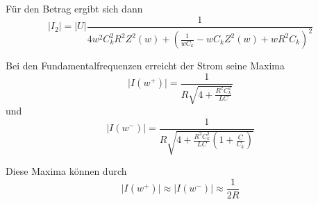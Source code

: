 Für den Betrag ergibt sich dann
\begin{equation}
    \lvert I_2\rvert = \lvert U\rvert \frac{1}{ 4w^2C_k^2R^2Z^2(w) + ( \frac{1}{wC_k} - wC_kZ^2(w) + wR^2C_k )^2 }
\end{equation}

Bei den Fundamentalfrequenzen erreicht der Strom seine Maxima
\begin{equation}
    \lvert I(w^{+})\rvert = \frac{1}{ R\sqrt{4 + \frac{R^2C_k^2}{LC}}}
\end{equation}
und
\begin{equation}
    \lvert I(w^{-})\rvert = \frac{1}{ R\sqrt{4 + \frac{R^2C_k^2}{LC}(1+\frac{C}{C_k})}}
\end{equation}

Diese Maxima können durch 
\begin{equation}
    \lvert I(w^{+})\rvert \approx \lvert I(w^{-})\rvert \approx \frac{1}{2R}
\end{equation}